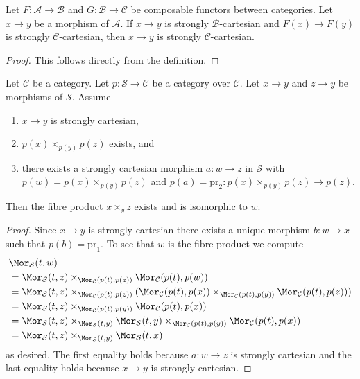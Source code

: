 \begin{lemma}
\label{lemma-cartesian-over-cartesian}
Let $F : \mathcal{A} \to \mathcal{B}$ and $G : \mathcal{B} \to \mathcal{C}$
be composable functors between categories. Let $x \to y$ be a morphism of
$\mathcal{A}$. If $x \to y$ is strongly $\mathcal{B}$-cartesian
and $F(x) \to F(y)$ is strongly $\mathcal{C}$-cartesian, then
$x \to y$ is strongly $\mathcal{C}$-cartesian.
\end{lemma}

\begin{proof}
This follows directly from the definition.
\end{proof}

\begin{lemma}
\label{lemma-strongly-cartesian-fibre-product}
Let $\mathcal{C}$ be a category.
Let $p : \mathcal{S} \to \mathcal{C}$ be a category over $\mathcal{C}$.
Let $x \to y$ and $z \to y$ be morphisms of $\mathcal{S}$.
Assume
\begin{enumerate}
\item $x \to y$ is strongly cartesian,
\item $p(x) \times_{p(y)} p(z)$ exists, and
\item there exists a strongly cartesian morphism $a : w \to z$ in
$\mathcal{S}$ with $p(w) = p(x) \times_{p(y)} p(z)$ and
$p(a) = \text{pr}_2 : p(x) \times_{p(y)} p(z) \to p(z)$.
\end{enumerate}
Then the fibre product $x \times_y z$ exists and is isomorphic to $w$.
\end{lemma}

\begin{proof}
Since $x \to y$ is strongly cartesian there exists a unique morphism
$b : w \to x$ such that $p(b) = \text{pr}_1$. To see that $w$ is the
fibre product we compute
\begin{align*}
& \Mor_\mathcal{S}(t, w) \\
& = \Mor_\mathcal{S}(t, z)
\times_{\Mor_\mathcal{C}(p(t), p(z))}
\Mor_\mathcal{C}(p(t), p(w)) \\
& = \Mor_\mathcal{S}(t, z)
\times_{\Mor_\mathcal{C}(p(t), p(z))}
(\Mor_\mathcal{C}(p(t), p(x))
\times_{\Mor_\mathcal{C}(p(t), p(y))}
\Mor_\mathcal{C}(p(t), p(z))) \\
& = \Mor_\mathcal{S}(t, z)
\times_{\Mor_\mathcal{C}(p(t), p(y))}
\Mor_\mathcal{C}(p(t), p(x)) \\
& = \Mor_\mathcal{S}(t, z)
\times_{\Mor_\mathcal{S}(t, y)}
\Mor_\mathcal{S}(t, y)
\times_{\Mor_\mathcal{C}(p(t), p(y))}
\Mor_\mathcal{C}(p(t), p(x)) \\
& = \Mor_\mathcal{S}(t, z)
\times_{\Mor_\mathcal{S}(t, y)}
\Mor_\mathcal{S}(t, x)
\end{align*}
as desired. The first equality holds because $a : w \to z$ is strongly
cartesian and the last equality holds because $x \to y$ is strongly
cartesian.
\end{proof}

